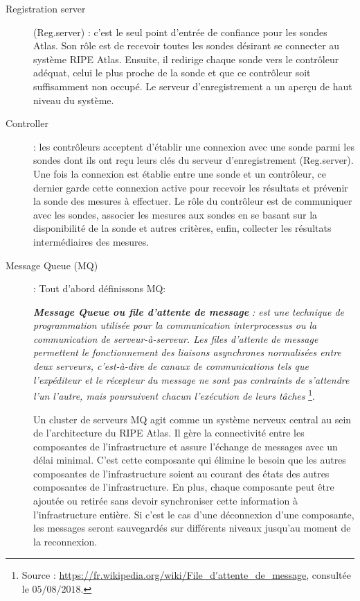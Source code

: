 \begin{description}
	
	\item [Registration server] (Reg.server) : c'est le seul point d'entrée de confiance pour les sondes Atlas. Son rôle est de recevoir toutes les sondes désirant se connecter au système RIPE Atlas. Ensuite, il redirige chaque sonde vers le contrôleur adéquat, celui le plus proche de la sonde et que ce contrôleur  soit suffisamment non occupé.  Le serveur d'enregistrement  a un aperçu de haut niveau du système.
	
	\item [Controller] : les contrôleurs acceptent d'établir une connexion avec une sonde parmi les sondes dont ils ont reçu leurs clés du serveur d'enregistrement (Reg.server). Une fois la connexion est établie entre une sonde et un contrôleur, ce dernier garde cette connexion active pour recevoir les résultats et prévenir la sonde des mesures à effectuer.  Le rôle du contrôleur est de communiquer avec les sondes,  associer les mesures aux sondes en se basant sur la disponibilité de la sonde et autres critères, enfin, collecter les résultats intermédiaires des mesures.
	
	\item [Message Queue (MQ)] : Tout d'abord définissons MQ:
	
	\begin{tcolorbox}[title=Message Queue]
		\og    \textbf{\textit{Message Queue ou file d'attente de message}} \textit{:  est une technique de programmation utilisée pour la communication interprocessus ou la communication de serveur-à-serveur. Les files d'attente de message permettent le fonctionnement des liaisons asynchrones normalisées entre deux serveurs, c'est-à-dire de canaux de communications tels que l'expéditeur et le récepteur du message ne sont pas contraints de s'attendre l'un l'autre, mais poursuivent chacun l'exécution de leurs tâches} \footnote{Source : \url{https://fr.wikipedia.org/wiki/File\_d'attente\_de\_message}, consultée le $05/08/2018$.}. \fg{}
	\end{tcolorbox} 
	
	Un cluster de serveurs MQ  agit comme un système nerveux central au sein de l'architecture du RIPE Atlas. Il gère la connectivité entre les composantes de l'infrastructure et  assure l'échange de messages avec un délai minimal. C'est cette composante qui élimine le besoin que les autres composantes de l'infrastructure soient au courant des états des autres composantes de l'infrastructure. En plus, chaque composante peut être ajoutée ou retirée sans devoir synchroniser cette information à l'infrastructure entière. Si c'est le cas d'une déconnexion d'une composante, les messages seront sauvegardés sur différents niveaux jusqu'au moment de la reconnexion.
	

\end{description}

